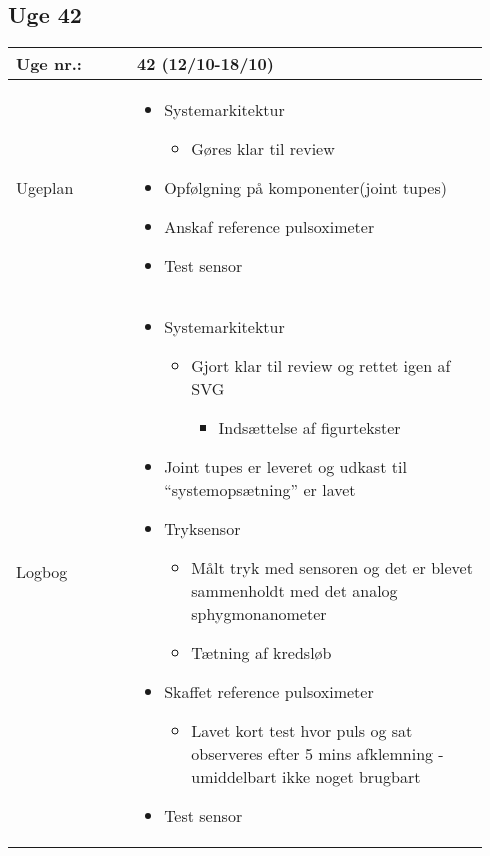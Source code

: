 	\subsection{Uge 42}
	\begin{longtable}{|p{0.24\linewidth}|p{0.7\linewidth}|}
		\hline
		Uge nr.: & 42 (12/10-18/10)\\ \hline
		Ugeplan & 
		\begin{itemize}
			\item Systemarkitektur 
			\begin{itemize}
				\item Gøres klar til review
			\end{itemize}
			\item Opfølgning på komponenter(joint tupes) 
			\item Anskaf reference pulsoximeter
			\item Test sensor
		\end{itemize}
		
		\\ \hline
		Logbog & 
		\begin{itemize}
			\item Systemarkitektur 
			\begin{itemize}
				\item Gjort klar til review og rettet igen af SVG
				\begin{itemize}
					\item Indsættelse af figurtekster 
				\end{itemize}
			\end{itemize}
			\item Joint tupes er leveret og udkast til “systemopsætning” er lavet
			\item Tryksensor
			\begin{itemize}
				\item Målt tryk med sensoren og det er blevet sammenholdt med det analog sphygmonanometer
				\item Tætning af kredsløb
			\end{itemize}
			\item Skaffet reference pulsoximeter
			\begin{itemize}
				\item Lavet kort test hvor puls og sat observeres efter 5 mins afklemning - umiddelbart ikke noget brugbart
			\end{itemize}
			\item Test sensor
		\end{itemize}
		\\ \hline
	\end{longtable}
	
